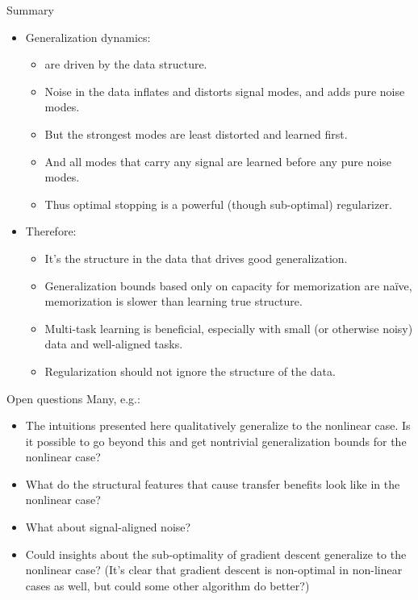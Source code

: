 \documentclass{beamer}
\begin{document}
\begin{frame}{Summary}
\begin{itemize}[<+->]
\item Generalization dynamics:
    \begin{itemize}
    \item are driven by the data structure.
    \item Noise in the data inflates and distorts signal modes, and adds pure noise modes.
    \item But the strongest modes are least distorted and learned first.
    \item And all modes that carry any signal are learned before any pure noise modes.
    \item Thus optimal stopping is a powerful (though sub-optimal) regularizer.
    \end{itemize}
\item Therefore:
    \begin{itemize}
    \item It's the structure in the data that drives good generalization.
    \item Generalization bounds based only on capacity for memorization are na{\"i}ve, memorization is slower than learning true structure.
    \item Multi-task learning is beneficial, especially with small (or otherwise noisy) data and well-aligned tasks.
    \item Regularization should not ignore the structure of the data.
    \end{itemize}
\end{itemize}
\end{frame}

\begin{frame}{Open questions}
Many, e.g.:
\begin{itemize}
\item The intuitions presented here qualitatively generalize to the nonlinear case. Is it possible to go beyond this and get nontrivial generalization bounds for the nonlinear case? 
\item What do the structural features that cause transfer benefits look like in the nonlinear case?
\item What about signal-aligned noise?
\item Could insights about the sub-optimality of gradient descent generalize to the nonlinear case? (It's clear that gradient descent is non-optimal in non-linear cases as well, but could some other algorithm do better?)
\end{itemize}
\end{frame}
\end{document}
